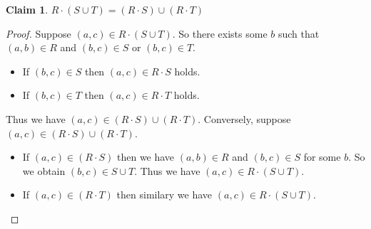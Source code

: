 \documentclass[12pt,aspectratio=169]{beamer}
\theoremstyle{claim}
\newtheorem{claim}[theorem]{Claim}%
\begin{document}
\begin{frame}
    \begin{claim}
        $R \cdot (S \cup T) = (R \cdot S) \cup (R \cdot T)$
    \end{claim}

    \begin{proof}
        Suppose $(a,c) \in R \cdot (S \cup T)$.
        So there exists some $b$ such that $(a,b) \in R$ and $(b,c) \in S$ or $(b,c) \in T$.
        \begin{itemize}
            \item If $(b,c) \in S$ then $(a,c) \in R \cdot S$ holds.
            \item If $(b,c) \in T$ then $(a,c) \in R \cdot T$ holds.
        \end{itemize}
        Thus we have $(a,c) \in (R \cdot S) \cup (R \cdot T)$.
        Conversely, suppose $(a,c) \in (R \cdot S) \cup (R \cdot T)$.
        \begin{itemize}
            \item If $(a,c) \in (R \cdot S)$ then we have $(a,b) \in R$ and $(b,c) \in S$ for some $b$.
            So we obtain $(b,c) \in S \cup T$. Thus we have $(a,c) \in R \cdot (S \cup T)$.
            \item If $(a,c) \in (R \cdot T)$ then similary we have $(a,c) \in R \cdot (S \cup T)$.
        \end{itemize}
    \end{proof}
\end{frame}
\end{document}
